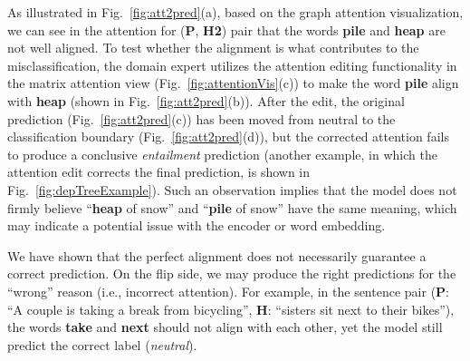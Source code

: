 As illustrated in Fig.~\ref{fig:att2pred}(a), based on the graph attention visualization, we can see in the attention for (\textbf{P}, \textbf{H2}) pair that the words \textbf{pile} and \textbf{heap} are not well aligned.
%
To test whether the alignment is what contributes to the misclassification, the domain expert utilizes the attention editing functionality in the matrix attention view (Fig.~\ref{fig:attentionVis}(c)) to make the word \textbf{pile} align with \textbf{heap} (shown in Fig.~\ref{fig:att2pred}(b)).
%
After the edit, the original prediction (Fig.~\ref{fig:att2pred}(c)) has been moved from neutral to the classification boundary (Fig.~\ref{fig:att2pred}(d)), but the corrected attention fails to produce a conclusive \emph{entailment} prediction (another example, in which the attention edit corrects the final prediction, is shown in Fig.~\ref{fig:depTreeExample}).
%
Such an observation implies that the model does not firmly believe ``\textbf{heap} of snow'' and ``\textbf{pile} of snow'' have the same meaning, which may indicate a potential issue with the encoder or word embedding.




We have shown that the perfect alignment does not necessarily guarantee a correct prediction.
%
On the flip side, we may produce the right predictions for the ``wrong'' reason (i.e., incorrect attention).
For example, in the sentence pair (\textbf{P}: ``A couple is taking a break from bicycling'', \textbf{H}: ``sisters sit next to their bikes''), the words \textbf{take} and \textbf{next} should not align with each other,
yet the model still predict the correct label (\emph{neutral}).%

